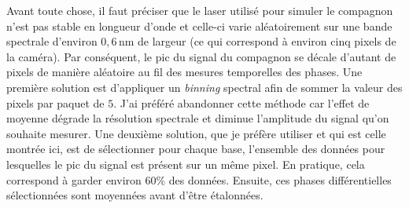 Avant toute chose, il faut préciser que le laser utilisé pour simuler le compagnon n'est pas stable en longueur d'onde et celle-ci varie aléatoirement sur une bande spectrale d'environ $0,6 \,$nm de largeur (ce qui correspond à environ cinq pixels de la caméra). Par conséquent, le pic du signal du compagnon se décale d'autant de pixels de manière aléatoire au fil des mesures temporelles des phases. Une première solution est d'appliquer un \textit{binning} spectral afin de sommer la valeur des pixels par paquet de $5$. J'ai préféré abandonner cette méthode car l'effet de moyenne dégrade la résolution spectrale et diminue l'amplitude du signal qu'on souhaite mesurer. Une deuxième solution, que je préfère utiliser et qui est celle montrée ici, est de sélectionner pour chaque base, l'ensemble des données pour lesquelles le pic du signal est présent sur un même pixel. En pratique, cela correspond à garder environ $60\%$ des données. Ensuite, ces phases différentielles sélectionnées sont moyennées avant d'être étalonnées.

